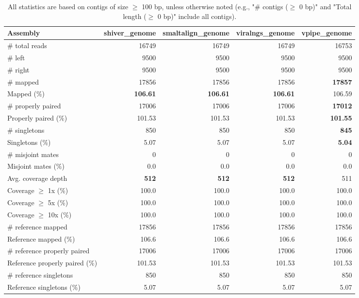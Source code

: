 \documentclass[12pt,a4paper]{article}
\begin{document}
\begin{table}[ht]
\begin{center}
\caption{All statistics are based on contigs of size $\geq$ 100 bp, unless otherwise noted (e.g., "\# contigs ($\geq$ 0 bp)" and "Total length ($\geq$ 0 bp)" include all contigs).}
\begin{tabular}{|l*{4}{|r}|}
\hline
Assembly & shiver\_genome & smaltalign\_genome & viralngs\_genome & vpipe\_genome \\ \hline
\# total reads & 16749 & 16749 & 16749 & 16753 \\ \hline
\# left & 9500 & 9500 & 9500 & 9500 \\ \hline
\# right & 9500 & 9500 & 9500 & 9500 \\ \hline
\# mapped & 17856 & 17856 & 17856 & {\bf 17857} \\ \hline
Mapped (\%) & {\bf 106.61} & {\bf 106.61} & {\bf 106.61} & 106.59 \\ \hline
\# properly paired & 17006 & 17006 & 17006 & {\bf 17012} \\ \hline
Properly paired (\%) & 101.53 & 101.53 & 101.53 & {\bf 101.55} \\ \hline
\# singletons & 850 & 850 & 850 & {\bf 845} \\ \hline
Singletons (\%) & 5.07 & 5.07 & 5.07 & {\bf 5.04} \\ \hline
\# misjoint mates & 0 & 0 & 0 & 0 \\ \hline
Misjoint mates (\%) & 0.0 & 0.0 & 0.0 & 0.0 \\ \hline
Avg. coverage depth & {\bf 512} & {\bf 512} & {\bf 512} & 511 \\ \hline
Coverage $\geq$ 1x (\%) & 100.0 & 100.0 & 100.0 & 100.0 \\ \hline
Coverage $\geq$ 5x (\%) & 100.0 & 100.0 & 100.0 & 100.0 \\ \hline
Coverage $\geq$ 10x (\%) & 100.0 & 100.0 & 100.0 & 100.0 \\ \hline
\# reference mapped & 17856 & 17856 & 17856 & 17856 \\ \hline
Reference mapped (\%) & 106.6 & 106.6 & 106.6 & 106.6 \\ \hline
\# reference properly paired & 17006 & 17006 & 17006 & 17006 \\ \hline
Reference properly paired (\%) & 101.53 & 101.53 & 101.53 & 101.53 \\ \hline
\# reference singletons & 850 & 850 & 850 & 850 \\ \hline
Reference singletons (\%) & 5.07 & 5.07 & 5.07 & 5.07 \\ \hline

\end{tabular}
\end{center}
\end{table}
\end{document}
